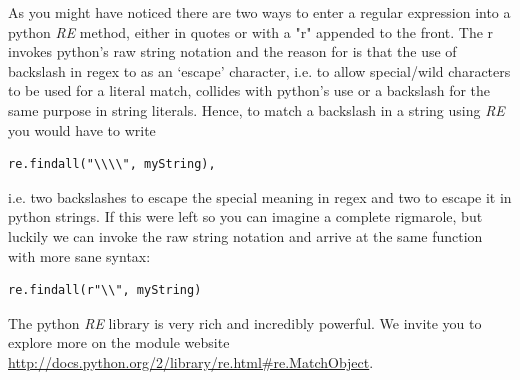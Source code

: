\begin{digression*}
    As you might have noticed there are two ways to enter a regular expression into a python \textit{RE} method, either in quotes or with a "r" appended to the front. The r invokes python's raw string notation and the reason for is that the use of backslash in regex to as an `escape' character, i.e. to allow special/wild characters to be used for a literal match, collides with python's use or a backslash for the same purpose in string literals. Hence, to match a backslash in a string using \textit{RE} you would have to write 

\begin{verbatim}
re.findall("\\\\", myString),
\end{verbatim}

i.e. two backslashes to escape the special meaning in regex and two to escape it in python strings. If this were left so you can imagine a complete rigmarole, but luckily we can invoke the raw string notation and arrive at the same function with more sane syntax:

\begin{verbatim}
re.findall(r"\\", myString)
\end{verbatim}


\end{digression*}



The python \textit{RE} library is very rich and incredibly powerful. We invite you to explore more on the module website \url{http://docs.python.org/2/library/re.html#re.MatchObject}.

\vspace{.5 in}


